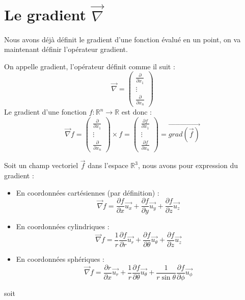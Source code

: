 \section{Le gradient \(\overrightarrow{\nabla}\)}
Nous avons déjà définit le gradient d'une fonction évalué en un point, on va maintenant définir l'opérateur gradient.
\begin{defi}
On appelle gradient, l'opérateur définit comme il suit :
$$\overrightarrow{\nabla}=\begin{pmatrix}\frac{\partial}{\partial x_1}\\\vdots\\\frac{\partial}{\partial x_n}\end{pmatrix}$$
\newline
Le gradient d'une fonction $f:\mathbb{R}^n\to\mathbb{R}$ est donc :
$$\overrightarrow{\nabla}f=\begin{pmatrix}\frac{\partial}{\partial x_1}\\\vdots\\\frac{\partial}{\partial x_n}\end{pmatrix}\times f=\begin{pmatrix}\frac{\partial f}{\partial x_1}\\\vdots\\\frac{\partial f}{\partial x_n}\end{pmatrix}=\overrightarrow{grad(\overrightarrow{f})}$$
\end{defi}
\begin{prop}
Soit un champ vectoriel $\overrightarrow{f}$ dans l'espace $\mathbb{R}^3$, nous avons pour expression du gradient :
\begin{itemize}
    \item En coordonnées cartésiennes (par définition) : $$\overrightarrow{\nabla}f=\frac{\partial f}{\partial x}\overrightarrow{u_x}+\frac{\partial f}{\partial y}\overrightarrow{u_y}+\frac{\partial f}{\partial z}\overrightarrow{u_z}$$
    \item En coordonnées cylindriques : $$\overrightarrow{\nabla}f=\frac{1}{r}\frac{\partial f}{\partial r}\overrightarrow{u_r}+\frac{\partial f}{\partial \theta}\overrightarrow{u_\theta}+\frac{\partial f}{\partial z}\overrightarrow{u_z}$$
    \item En coordonnées sphériques : $$\overrightarrow{\nabla}f=\frac{\partial r}{\partial x}\overrightarrow{u_r}+\frac{1}{r}\frac{\partial f}{\partial \theta}\overrightarrow{u_\theta}+\frac{1}{r\sin{\theta}}\frac{\partial f}{\partial \phi}\overrightarrow{u_\phi}$$
\end{itemize}
\end{prop}
\begin{demo}
soit
\end{demo}
